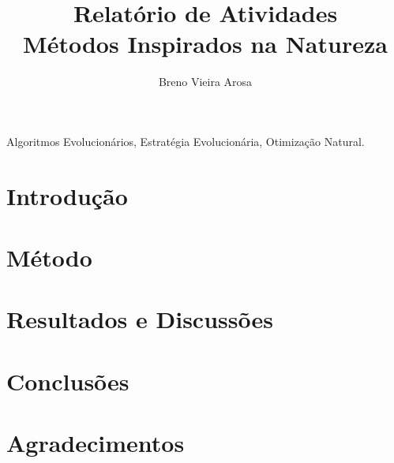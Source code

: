 \documentclass[a4paper,journal]{IEEEtran}
\begin{document}
%
\title{Relatório de Atividades \\ Métodos Inspirados na Natureza}



\author{Breno Vieira Arosa}

\maketitle

\begin{abstract}

\end{abstract}

\begin{IEEEkeywords}
Algoritmos Evolucionários, Estratégia Evolucionária, Otimização Natural.
\end{IEEEkeywords}

\section{Introdução} \label{sec:introduction}


\section{Método} \label{sec:methodology}


\section{Resultados e Discussões} \label{sec:results}


\section{Conclusões} \label{sec:conclusion}


\section{Agradecimentos} \label{sec:acknowledgments}

\end{document}

